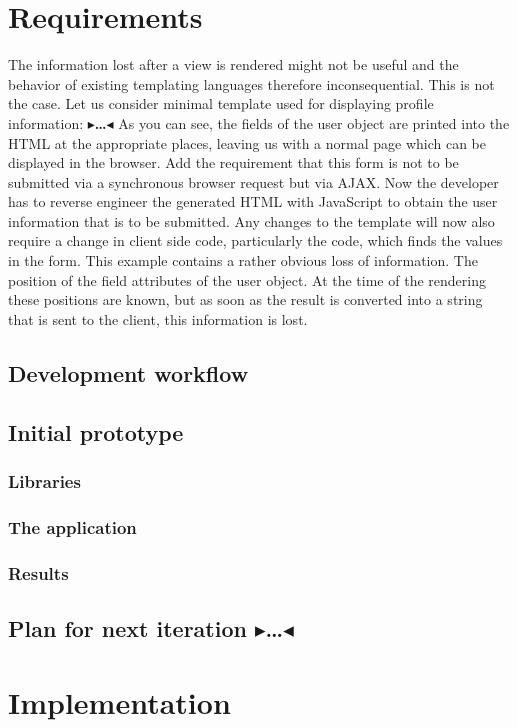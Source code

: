 \documentclass[twoside,11pt,openright]{report}
\newcommand{\todo}[1]{{\color[rgb]{.5,0,0}\textbf{$\blacktriangleright$#1$\blacktriangleleft$}}}
\begin{document}
\chapter{Requirements}
The information lost after a view is rendered might not be useful and
the behavior of existing templating languages therefore inconsequential.
This is not the case. Let us consider minimal template used for
displaying profile information:
\todo{\dots}
As you can see, the fields of the user object are printed into the HTML
at the appropriate places, leaving us with a normal page which can be
displayed in the browser.
Add the requirement that this form is not to be submitted via a
synchronous browser request but via AJAX. Now the developer has to
reverse engineer the generated HTML with JavaScript to obtain the
user information that is to be submitted. Any changes to the template
will now also require a change in client side code, particularly the
code, which finds the values in the form.
This example contains a rather obvious loss of information.
The position of the field attributes of the user object.
At the time of the rendering these positions are known, but as soon as the
result is converted into a string that is sent to the client, this
information is lost.

\section{Development workflow}
\section{Initial prototype}
\subsection{Libraries}
\subsection{The application}
\subsection{Results}
\section{Plan for next iteration \todo{\dots}}


\chapter{Implementation}
\end{document}
